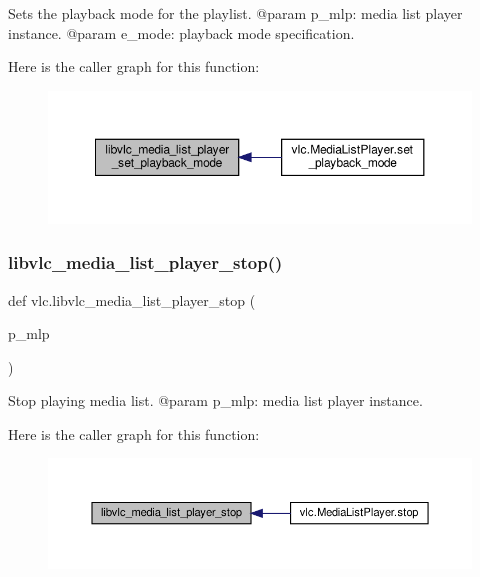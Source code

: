 \begin{DoxyVerb}Sets the playback mode for the playlist.
@param p_mlp: media list player instance.
@param e_mode: playback mode specification.
\end{DoxyVerb}
 Here is the caller graph for this function\+:
\nopagebreak
\begin{figure}[H]
\begin{center}
\leavevmode
\includegraphics[width=350pt]{namespacevlc_a31fd24c2a75a7af7b6f1d19de6b66e21_icgraph}
\end{center}
\end{figure}
\mbox{\label{namespacevlc_afdd34bfadc2c26d87c721ac0c71089d7}} 
\subsubsection{\texorpdfstring{libvlc\+\_\+media\+\_\+list\+\_\+player\+\_\+stop()}{libvlc\_media\_list\_player\_stop()}}
{\footnotesize\ttfamily def vlc.\+libvlc\+\_\+media\+\_\+list\+\_\+player\+\_\+stop (\begin{DoxyParamCaption}\item[{}]{p\+\_\+mlp }\end{DoxyParamCaption})}

\begin{DoxyVerb}Stop playing media list.
@param p_mlp: media list player instance.
\end{DoxyVerb}
 Here is the caller graph for this function\+:
\nopagebreak
\begin{figure}[H]
\begin{center}
\leavevmode
\includegraphics[width=350pt]{namespacevlc_afdd34bfadc2c26d87c721ac0c71089d7_icgraph}
\end{center}
\end{figure}
\mbox{\label{namespacevlc_a45316f80cd7384457137cf0154c99dd7}} 
